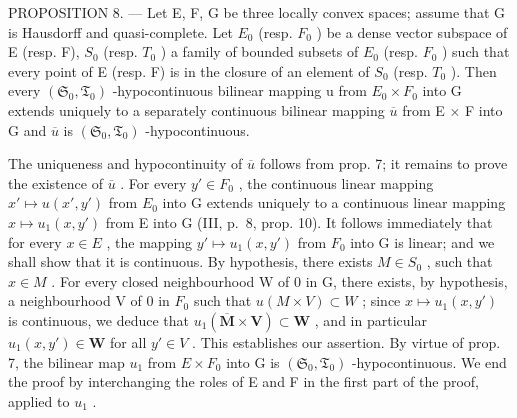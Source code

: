 PROPOSITION 8. --- Let E, F, G be three locally convex spaces; assume that G is Hausdorff and quasi-complete. Let \(E_{0}\) (resp. \(F_{0}\) ) be a dense vector subspace of E (resp. F), \(S_{0}\) (resp. \(T_{0}\) ) a family of bounded subsets of \(E_{0}\) (resp. \(F_{0}\) ) such that every point of E (resp. F) is in the closure of an element of \(S_{0}\) (resp. \(T_{0}\) ). Then every \((\mathfrak{S}_{0}, \mathfrak{T}_{0})\) -hypocontinuous bilinear mapping u from \(E_{0} \times F_{0}\) into G extends uniquely to a separately continuous bilinear mapping \(\overline{u}\) from E × F into G and \(\overline{u}\) is \((\mathfrak{S}_{0}, \mathfrak{T}_{0})\) -hypocontinuous.

The uniqueness and hypocontinuity of \(\overline{u}\) follows from prop. 7; it remains to prove the existence of \(\overline{u}\) . For every \(y' \in F_{0}\) , the continuous linear mapping \(x' \mapsto u(x', y')\) from \(E_{0}\) into G extends uniquely to a continuous linear mapping \(x \mapsto u_{1}(x, y')\) from E into G (III, p.~8, prop. 10). It follows immediately that for every \(x \in E\) , the mapping \(y' \mapsto u_{1}(x, y')\) from \(F_{0}\) into G is linear; and we shall show that it is continuous. By hypothesis, there exists \(M \in S_{0}\) , such that \(x \in M\) . For every closed neighbourhood W of 0 in G, there exists, by hypothesis, a neighbourhood V of 0 in \(F_{0}\) such that \(u(M \times V) \subset W\) ; since \(x \mapsto u_{1}(x, y')\) is continuous, we deduce that \(u_{1}(\overline{\mathbf{M}} \times \mathbf{V}) \subset \mathbf{W}\) , and in particular \(u_{1}(x, y') \in \mathbf{W}\) for all \(y' \in V\) . This establishes our assertion. By virtue of prop. 7, the bilinear map \(u_{1}\) from \(E \times F_{0}\) into G is \((\mathfrak{S}_{0}, \mathfrak{T}_{0})\) -hypocontinuous. We end the proof by interchanging the roles of E and F in the first part of the proof, applied to \(u_{1}\) .
